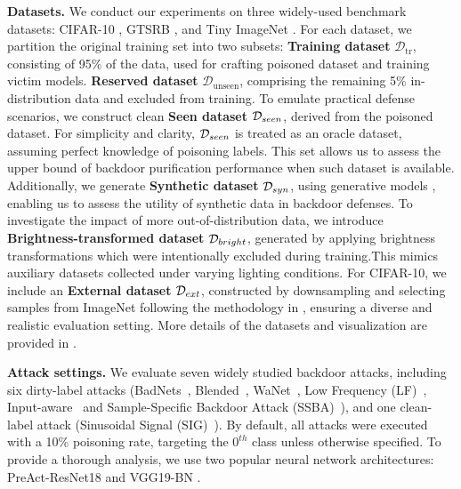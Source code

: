 \textbf{Datasets.} We conduct our experiments on three widely-used benchmark datasets: CIFAR-10 \citep{krizhevsky2009learning}, GTSRB \citep{stallkamp2011german}, and Tiny ImageNet \citep{le2015tiny}. 
For each dataset, we partition the original training set into two subsets:
 \textbf{Training dataset} $\mathcal{D}_{\text{tr}}$, consisting of 95\% of the data, used for crafting poisoned dataset and training victim models.  \textbf{Reserved dataset} $\mathcal{D}_{\text{unseen}}$, comprising the remaining 5\% in-distribution data and excluded from training.
To emulate practical defense scenarios, we construct clean  \textbf{Seen dataset} $\mathcal{D}_{seen}$, derived from the poisoned dataset. For simplicity and clarity, $\mathcal{D}_{seen}$ is treated as an oracle dataset, assuming perfect knowledge of poisoning labels. This set allows us to assess the upper bound of backdoor purification performance when such dataset is available. Additionally, we generate  \textbf{Synthetic dataset} $\mathcal{D}_{syn}$, using generative models \citep{ho2020denoising,brock2018large}, enabling us to assess the utility of synthetic data in backdoor defenses.
%
To investigate the impact of more out-of-distribution data, we introduce \textbf{Brightness-transformed dataset} $\mathcal{D}_{bright}$, generated by applying brightness transformations which were intentionally excluded during training.This mimics auxiliary datasets collected under varying lighting conditions. For CIFAR-10, we include an  \textbf{External dataset }$\mathcal{D}_{ext}$, constructed by downsampling and selecting samples from ImageNet \citep{russakovsky2015imagenet} following the methodology in \citep{darlow2018cinic}, ensuring a diverse and realistic evaluation setting. More details of the datasets and visualization are provided in \app.


\textbf{Attack settings.} 
We evaluate seven widely studied backdoor attacks, including six dirty-label attacks (BadNets~\citep{gu2019badnets}, Blended~\citep{chen2017targeted}, WaNet~\citep{nguyen2021wanet}, Low Frequency  (LF)~\cite{zeng2021rethinking}, Input-aware~\citep{nguyen2020input} and Sample-Specific Backdoor Attack (SSBA)~\citep{li2021invisible}), and one clean-label attack (Sinusoidal Signal (SIG)~\citep{barni2019new}). By default, all attacks were executed with a 10\% poisoning rate, targeting the $0^{th}$ class unless otherwise specified. To provide a thorough analysis, we use two popular neural network architectures: PreAct-ResNet18 \citep{he2016identity} and VGG19-BN \citep{simonyan2014very}.

